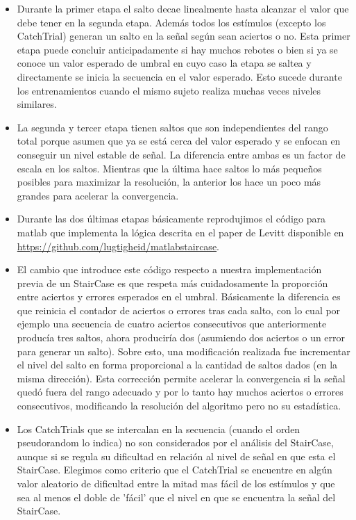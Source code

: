 \documentclass{article}
\numberwithin{figure}{section}
\begin{document}
\begin{itemize}
        \item Durante la primer etapa el salto decae linealmente hasta alcanzar el valor que debe tener en la segunda etapa. Además todos los estímulos (excepto los CatchTrial) generan un salto en la señal según sean aciertos o no. Esta primer etapa puede concluir anticipadamente si hay muchos rebotes o bien si ya se conoce un valor esperado de umbral en cuyo caso la etapa se saltea y directamente se inicia la secuencia en el valor esperado. Esto sucede durante los entrenamientos cuando el mismo sujeto realiza muchas veces niveles similares. 
        \item La segunda y tercer etapa tienen saltos que son independientes del rango total porque asumen que ya se está cerca del valor esperado y se enfocan en conseguir un nivel estable de señal. La diferencia entre ambas es un factor de escala en los saltos. Mientras que la última hace saltos lo más pequeños posibles para maximizar la resolución, la anterior los hace un poco más grandes para acelerar la convergencia. 
        \item Durante las dos últimas etapas básicamente reprodujimos el código para matlab que implementa la lógica descrita en el paper de Levitt\cite{staircase} disponible en \url{https://github.com/lugtigheid/matlabstaircase}. 
        \item El cambio que introduce este código respecto a nuestra implementación previa de un StairCase es que respeta más cuidadosamente la proporción entre aciertos y errores esperados en el umbral. Básicamente la diferencia es que reinicia el contador de aciertos o errores tras cada salto, con lo cual por ejemplo una secuencia de cuatro aciertos consecutivos que anteriormente producía tres saltos, ahora produciría dos (asumiendo dos aciertos o un error para generar un salto). Sobre esto, una modificación realizada fue incrementar el nivel del salto en forma proporcional a la cantidad de saltos dados (en la misma dirección). Esta corrección permite acelerar la convergencia si la señal quedó fuera del rango adecuado y por lo tanto hay muchos aciertos o errores consecutivos, modificando la resolución del algoritmo pero no su estadística.
        \item Los CatchTrials que se intercalan en la secuencia (cuando el orden pseudorandom lo indica) no son considerados por el análisis del StairCase, aunque si se regula su dificultad en relación al nivel de señal en que esta el StairCase. Elegimos como criterio que el CatchTrial se encuentre en algún valor aleatorio de dificultad entre la mitad mas fácil de los estímulos y que sea al menos el doble de 'fácil' que el nivel en que se encuentra la señal del StairCase.
        
    \end{itemize}
    
\end{document}
